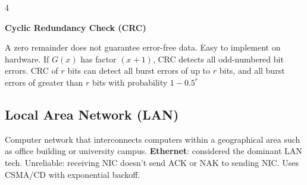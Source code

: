 \documentclass[10pt]{extarticle}
\newenvironment{compactfigure}{\par\begingroup\setlength{\parskip}{0pt}\noindent
\begin{minipage}{\linewidth}\centering}{
\end{minipage}\par\endgroup}
\begin{document}
\begin{multicols}{4}
\noindent\begin{minipage}{\linewidth}
\textbf{Cyclic Redundancy Check (CRC)}
\begin{compactfigure}
\begingroup\setlength{\fboxsep}{1.4pt}\setlength{\fboxrule}{0.35pt}
\endgroup
\end{compactfigure}
\end{minipage}
A zero remainder does not guarantee error-free data.
Easy to implement on hardware. If $G(x)$ has factor $(x+1)$, CRC detects all odd-numbered bit errors. CRC of $r$ bits can detect all burst errors of up to $r$ bits, and all burst errors of greater than $r$ bits with probability $1-0.5^r$

\subsection{Local Area Network (LAN)}
Computer network that interconnects computers within a geographical area such as office building or university campus.
\textbf{Ethernet}: considered the dominant LAN tech. Unreliable: receiving NIC doesn’t send ACK or NAK
to sending NIC. Uses CSMA/CD with exponential backoff.


\end{multicols}
\end{document}

